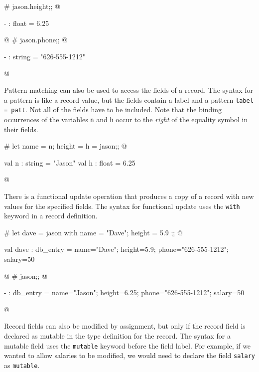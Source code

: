 \begin{ocaml}
# jason.height;;
@
\begin{topoutput}
- : float = 6.25
\end{topoutput}
@
# jason.phone;;
@
\begin{topoutput}
- : string = "626-555-1212"
\end{topoutput}
@
\end{ocaml}
%
\label{patterns:record}
Pattern matching can also be used to access the fields of a record.
The syntax for a pattern is like a record value, but the fields
contain a label and a pattern \hbox{\lstinline/label = patt/}.  Not all of the
fields have to be included.  Note that the binding occurrences of the
variables \hbox{\lstinline/n/} and \hbox{\lstinline/h/} occur to the \emph{right} of the equality symbol
in their fields.

\begin{ocaml}
# let { name = n; height = h } = jason;;
@
\begin{topoutput}
val n : string = "Jason"
val h : float = 6.25
\end{topoutput}
@
\end{ocaml}


\label{records:record-update}
There is a functional update operation that produces a copy of a
record with new values for the specified fields.  The syntax for
functional update uses the \hbox{\lstinline/with/} keyword in a record definition.

\begin{ocaml}
# let dave = { jason with name = "Dave"; height = 5.9 };;
@
\begin{topoutput}
val dave : db_entry =
  {name="Dave"; height=5.9; phone="626-555-1212"; salary=50}
\end{topoutput}
@
# jason;;
@
\begin{topoutput}
- : db_entry = {name="Jason"; height=6.25;
                phone="626-555-1212"; salary=50}
\end{topoutput}
@
\end{ocaml}
%
\label{keyword:mutable(records)}
Record fields can also be modified by assignment, but only if the
record field is declared as mutable in the type definition for the
record.  The syntax for a mutable field uses the \hbox{\lstinline/mutable/}
keyword before the field label.  For example, if we wanted to allow
salaries to be modified, we would need to declare the field \hbox{\lstinline/salary/}
as \hbox{\lstinline/mutable/}.

